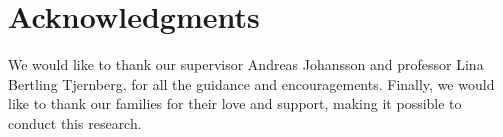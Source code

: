 \documentclass[english]{kththesis}
\begin{document}
\section*{Acknowledgments}
%
We would like to thank our supervisor Andreas Johansson and professor Lina Bertling Tjernberg, for all the guidance and encouragements. Finally, we would like to thank our families for their love and support, making it possible to conduct this research.\\

\acknowlegmentssignature

\renewcommand{\chaptermark}[1]{ \markboth{#1}{}} 
\tableofcontents
  \markboth{\contentsname}{}

\cleardoublepage
\listoffigures

\cleardoublepage

\listoftables
\cleardoublepage

\lstlistoflistings

\cleardoublepage
\printglossary[type=\acronymtype, title={List of acronyms and abbreviations}]
\label{pg:lastPageofPreface}
\end{document}
